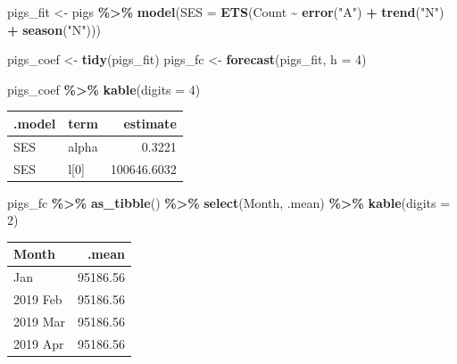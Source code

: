 \documentclass[
  11pt,
]{article}
\newenvironment{Shaded}{\begin{snugshade}}{\end{snugshade}}
\newcommand{\AttributeTok}[1]{\textcolor[rgb]{0.13,0.29,0.53}{#1}}
\newcommand{\DecValTok}[1]{\textcolor[rgb]{0.00,0.00,0.81}{#1}}
\newcommand{\FunctionTok}[1]{\textcolor[rgb]{0.13,0.29,0.53}{\textbf{#1}}}
\newcommand{\NormalTok}[1]{#1}
\newcommand{\OtherTok}[1]{\textcolor[rgb]{0.56,0.35,0.01}{#1}}
\newcommand{\SpecialCharTok}[1]{\textcolor[rgb]{0.81,0.36,0.00}{\textbf{#1}}}
\newcommand{\StringTok}[1]{\textcolor[rgb]{0.31,0.60,0.02}{#1}}
\newcounter{none} %
\begin{document}
\begin{Shaded}
\begin{Highlighting}[]
\NormalTok{pigs\_fit }\OtherTok{\textless{}{-}}\NormalTok{ pigs }\SpecialCharTok{\%\textgreater{}\%}
  \FunctionTok{model}\NormalTok{(}\AttributeTok{SES =} \FunctionTok{ETS}\NormalTok{(Count }\SpecialCharTok{\textasciitilde{}} \FunctionTok{error}\NormalTok{(}\StringTok{"A"}\NormalTok{) }\SpecialCharTok{+} \FunctionTok{trend}\NormalTok{(}\StringTok{"N"}\NormalTok{) }\SpecialCharTok{+} \FunctionTok{season}\NormalTok{(}\StringTok{"N"}\NormalTok{)))}

\NormalTok{pigs\_coef }\OtherTok{\textless{}{-}} \FunctionTok{tidy}\NormalTok{(pigs\_fit)}
\NormalTok{pigs\_fc }\OtherTok{\textless{}{-}} \FunctionTok{forecast}\NormalTok{(pigs\_fit, }\AttributeTok{h =} \DecValTok{4}\NormalTok{)}

\NormalTok{pigs\_coef }\SpecialCharTok{\%\textgreater{}\%} \FunctionTok{kable}\NormalTok{(}\AttributeTok{digits =} \DecValTok{4}\NormalTok{)}
\end{Highlighting}
\end{Shaded}

{\def\LTcaptype{none} %
\begin{longtable}[]{@{}llr@{}}
\toprule\noalign{}
.model & term & estimate \\
\midrule\noalign{}
\endhead
\bottomrule\noalign{}
\endlastfoot
SES & alpha & 0.3221 \\
SES & l{[}0{]} & 100646.6032 \\
\end{longtable}
}

\begin{Shaded}
\begin{Highlighting}[]
\NormalTok{pigs\_fc }\SpecialCharTok{\%\textgreater{}\%} \FunctionTok{as\_tibble}\NormalTok{() }\SpecialCharTok{\%\textgreater{}\%} \FunctionTok{select}\NormalTok{(Month, .mean) }\SpecialCharTok{\%\textgreater{}\%} \FunctionTok{kable}\NormalTok{(}\AttributeTok{digits =} \DecValTok{2}\NormalTok{)}
\end{Highlighting}
\end{Shaded}

{\def\LTcaptype{none} %
\begin{longtable}[]{@{}lr@{}}
\toprule\noalign{}
Month & .mean \\
\midrule\noalign{}
\endhead
\bottomrule\noalign{}
\endlastfoot
2019 Jan & 95186.56 \\
2019 Feb & 95186.56 \\
2019 Mar & 95186.56 \\
2019 Apr & 95186.56 \\
\end{longtable}
}
\end{document}
